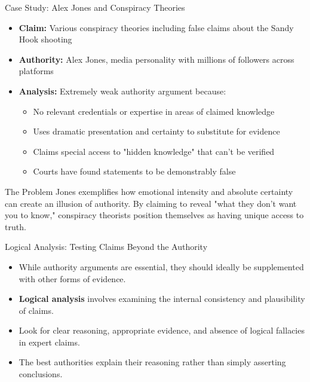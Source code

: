 \documentclass{beamer}
\begin{document}
\begin{frame}{Case Study: Alex Jones and Conspiracy Theories}
	\begin{itemize}
		\item \textbf{Claim:} Various conspiracy theories including false claims about the Sandy Hook shooting
		\item \textbf{Authority:} Alex Jones, media personality with millions of followers across platforms
		\item \textbf{Analysis:} Extremely weak authority argument because:
		\begin{itemize}
			\item No relevant credentials or expertise in areas of claimed knowledge
			\item Uses dramatic presentation and certainty to substitute for evidence
			\item Claims special access to "hidden knowledge" that can't be verified
			\item Courts have found statements to be demonstrably false
		\end{itemize}
	\end{itemize}
	
	\begin{alertblock}{The Problem}
		Jones exemplifies how emotional intensity and absolute certainty can create an illusion of authority. By claiming to reveal "what they don't want you to know," conspiracy theorists position themselves as having unique access to truth.
	\end{alertblock}
\end{frame}



\begin{frame}{Logical Analysis: Testing Claims Beyond the Authority}
    \begin{itemize}
    	\small
        \item While authority arguments are essential, they should ideally be supplemented with other forms of evidence.
        \item \textbf{Logical analysis} involves examining the internal consistency and plausibility of claims.
        \item Look for clear reasoning, appropriate evidence, and absence of logical fallacies in expert claims.
        \item The best authorities explain their reasoning rather than simply asserting conclusions.
    \end{itemize}
    
\end{frame}
\end{document}
